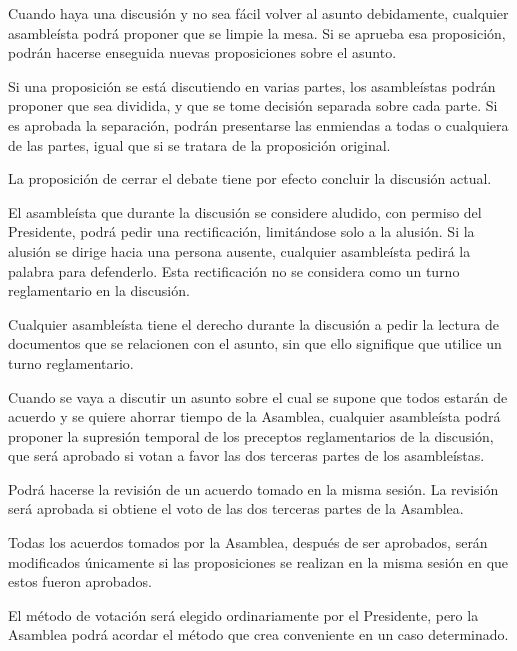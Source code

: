 \article
Cuando haya una discusión y no sea fácil volver al asunto debidamente, cualquier asambleísta podrá proponer que se limpie la mesa. Si se aprueba esa proposición, podrán hacerse enseguida nuevas proposiciones sobre el asunto.

\article
Si una proposición se está discutiendo en varias partes, los asambleístas podrán proponer que sea dividida, y que se tome decisión separada sobre cada parte. Si es aprobada la separación, podrán presentarse las enmiendas a todas o cualquiera de las partes, igual que si se tratara de la proposición original.

\article
La proposición de cerrar el debate tiene por efecto concluir la discusión actual.


\article
El asambleísta que durante la discusión se considere aludido, con permiso del Presidente, podrá pedir una rectificación, limitándose solo a la alusión. Si la alusión se dirige hacia una persona ausente, cualquier asambleísta pedirá la palabra para defenderlo. Esta rectificación no se considera como un turno reglamentario en la discusión.

\article
Cualquier asambleísta tiene el derecho durante la discusión a pedir la lectura de documentos que se relacionen con el asunto, sin que ello signifique que utilice un turno reglamentario.

\article
Cuando se vaya a discutir un asunto sobre el cual se supone que todos estarán de acuerdo y se quiere ahorrar tiempo de la Asamblea, cualquier asambleísta podrá proponer la supresión temporal de los preceptos reglamentarios de la discusión, que será aprobado si votan a favor las dos terceras partes de los asambleístas.

\article
Podrá hacerse la revisión de un acuerdo tomado en la misma sesión. La revisión será aprobada si obtiene el voto de las dos terceras partes de la Asamblea.

\article
Todas los acuerdos tomados por la Asamblea, después de ser aprobados, serán modificados únicamente si las proposiciones se realizan en la misma sesión en que estos fueron aprobados.


\article
\label{votaciones-inicio}
El método de votación será elegido ordinariamente por el Presidente, pero la Asamblea podrá acordar el método que crea conveniente en un caso determinado.

